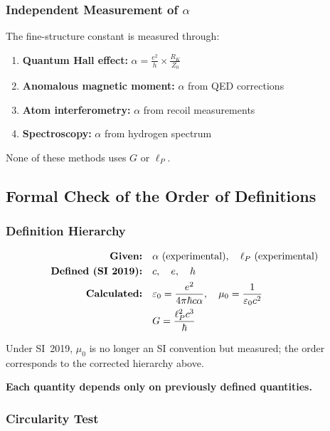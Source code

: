 	\subsubsection{Independent Measurement of $\alpha$}
	
	The fine-structure constant is measured through:
	
	\begin{enumerate}
		\item \textbf{Quantum Hall effect:} $\alpha = \frac{e^2}{h} \times \frac{R_K}{Z_0}$
		\item \textbf{Anomalous magnetic moment:} $\alpha$ from QED corrections
		\item \textbf{Atom interferometry:} $\alpha$ from recoil measurements
		\item \textbf{Spectroscopy:} $\alpha$ from hydrogen spectrum
	\end{enumerate}
	
	None of these methods uses $G$ or $\ell_P$.
	
	\subsection{Formal Check of the Order of Definitions}
	
	\subsubsection{Definition Hierarchy}
	
	\begin{align}
		\text{\textbf{Given:}} &\quad \alpha \text{ (experimental)}, \quad \ell_P \text{ (experimental)}\\
		\text{\textbf{Defined (SI 2019):}} &\quad c, \quad e, \quad h\\
		\text{\textbf{Calculated:}} &\quad \varepsilon_0 = \frac{e^2}{4\pi\hbar c\alpha}, \quad \mu_0 = \frac{1}{\varepsilon_0 c^2}\\
		&\quad G = \frac{\ell_P^2 c^3}{\hbar}
	\end{align}
	
	Under SI~2019, $\mu_0$ is no longer an SI convention but measured; the order corresponds to the corrected hierarchy above.
	
	\textbf{Each quantity depends only on previously defined quantities.}
	
	\subsubsection{Circularity Test}
	
